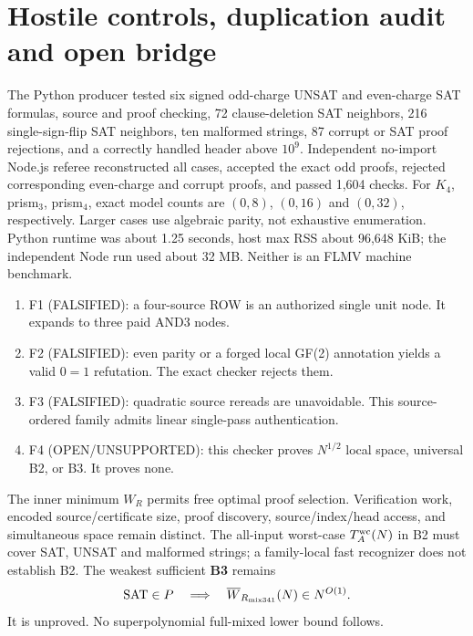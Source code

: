 \documentclass[11pt]{article}
\begin{document}
\section{Hostile controls, duplication audit and open bridge}
The Python producer tested six signed odd-charge UNSAT and even-charge SAT formulas, source and proof checking, 72 clause-deletion SAT neighbors, 216 single-sign-flip SAT neighbors, ten malformed strings, 87 corrupt or SAT proof rejections, and a correctly handled header above $10^9$. Independent no-import Node.js referee reconstructed all cases, accepted the exact odd proofs, rejected corresponding even-charge and corrupt proofs, and passed 1,604 checks. For $K_4$, prism$_3$, prism$_4$, exact model counts are $(0,8)$, $(0,16)$ and $(0,32)$, respectively. Larger cases use algebraic parity, not exhaustive enumeration. Python runtime was about 1.25 seconds, host max RSS about 96,648 KiB; the independent Node run used about 32 MB. Neither is an FLMV machine benchmark.

\begin{enumerate}
\item[] F1 (FALSIFIED): a four-source ROW is an authorized single unit node. It expands to three paid AND3 nodes.
\item[] F2 (FALSIFIED): even parity or a forged local GF(2) annotation yields a valid $0=1$ refutation. The exact checker rejects them.
\item[] F3 (FALSIFIED): quadratic source rereads are unavoidable. This source-ordered family admits linear single-pass authentication.
\item[] F4 (OPEN/UNSUPPORTED): this checker proves $N^{1/2}$ local space, universal B2, or B3. It proves none.
\end{enumerate}
The inner minimum $W_R$ permits free optimal proof selection. Verification work, encoded source/certificate size, proof discovery, source/index/head access, and simultaneous space remain distinct. The all-input worst-case $T_A^{\rm wc}(N)$ in B2 must cover SAT, UNSAT and malformed strings; a family-local fast recognizer does not establish B2. The weakest sufficient \textbf{B3} remains
\[
\mathrm{SAT}\in P\quad\Longrightarrow\quad\overline W_{R_{\rm mix341}}(N)\in N^{O(1)}.
\]
It is unproved. No superpolynomial full-mixed lower bound follows.
\end{document}
